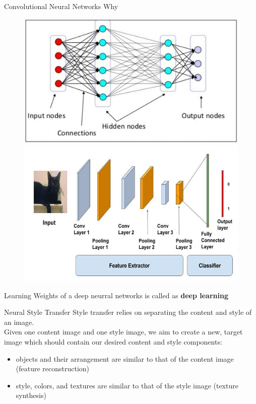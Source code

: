 \documentclass[10pt]{beamer}
\begin{document}
\begin{frame}[fragile]{Convolutional Neural Networks}
    Why \\ 
    \begin{figure}[ht]
      \hspace*{-1cm}\includegraphics[width=0.5\linewidth]{conv1} \\
      \hspace*{-1cm}\includegraphics[width=0.5\linewidth]{conv2}
    \end{figure}
Learning Weights of a deep neurral networks is called as \textbf{deep learning}
\end{frame}


\begin{frame}[fragile]{Neural Style Transfer}
   Style transfer relies on separating the content and style of an image. 
   \\
   Given one content image and one style image, we aim to create a new, target image which should contain our desired content and style components:
    \begin{itemize}
        \item objects and their arrangement are similar to that of the content image (feature reconstruction)
        \item style, colors, and textures are similar to that of the style image (texture synthesis)
    \end{itemize}

\end{frame}
\end{document}
